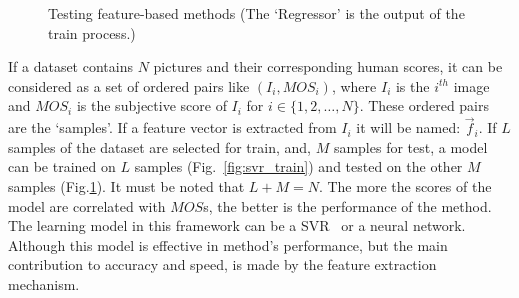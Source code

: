 \begin{figure}
    \centering
    \caption{Testing feature-based methods (The `Regressor' is the output of the train process.)}
    \label{fig:svr_test}
\end{figure}
If a dataset contains $N$ pictures and their corresponding human scores, it can be considered as a set of ordered pairs like $(I_i, MOS_i)$, where $I_i$ is the $i^{th}$ image and $MOS_i$ is the subjective score of $I_i$ for $i\in\{1,2,\ldots, N\}$. These ordered pairs are the `samples'. If a feature vector is extracted from $I_i$ it will be named: $\Vec{f}_i$. If $L$ samples of the dataset are selected for train, and, $M$ samples for test, a model can be trained on $L$ samples (Fig.~\ref{fig:svr_train}) and tested on the other $M$ samples (Fig.\ref{fig:svr_test}). It must be noted that $L+M=N$. The more the scores of the model are correlated with $MOS$s, the better is the performance of the method. The learning model in this framework can be a SVR~\cite{Vapnik1995} or a neural network. Although this model is effective in method's performance, but the main contribution to accuracy and speed, is made by the feature extraction mechanism.

